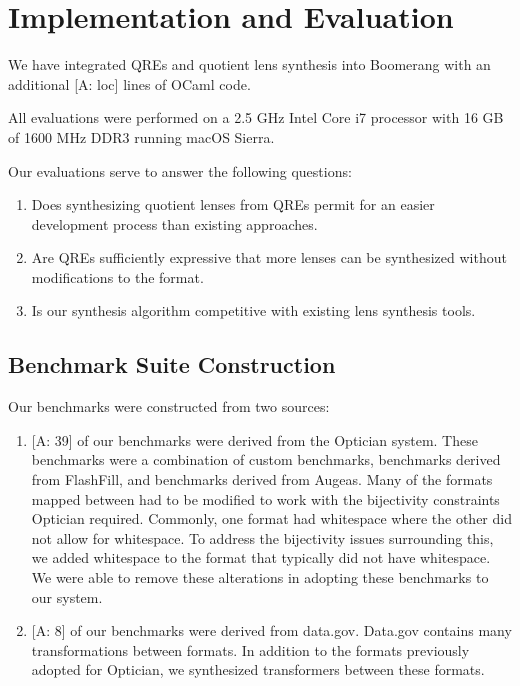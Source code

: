 \documentclass{svproc}
\newcommand{\FINISH}[3]{\ifdraft\textcolor{#1}{[#2: #3]}\fi}
\newcommand{\afm}[1]{\FINISH{dkgreen}{A}{#1}}
\begin{document}
\section{Implementation and Evaluation}
\label{impl}

We have integrated QREs and quotient lens synthesis into Boomerang with an
additional \afm{loc} lines of OCaml code. 

All evaluations were performed on a 2.5 GHz Intel Core i7 processor with 16 GB
of 1600 MHz DDR3 running macOS Sierra.

Our evaluations serve to answer the following questions:
\begin{enumerate}
\item Does synthesizing quotient lenses from QREs permit for an easier
  development process than existing approaches.

\item Are QREs sufficiently expressive that more lenses can be synthesized
  without modifications to the format. 

\item Is our synthesis algorithm competitive with existing lens synthesis
  tools.
\end{enumerate}

\subsection{Benchmark Suite Construction} 
Our benchmarks were constructed from two sources:
\begin{enumerate}
\item \afm{39} of our benchmarks were derived from the Optician system.  These
  benchmarks were a combination of custom benchmarks, benchmarks derived from
  FlashFill, and benchmarks derived from Augeas.  Many of the formats mapped
  between had to be modified to work with the bijectivity constraints
  Optician required.  Commonly, one format had whitespace where the other did
  not allow for whitespace.  To address the bijectivity issues surrounding this,
  we added whitespace to the format that typically did not have whitespace.  We
  were able to remove these alterations in adopting these benchmarks to our
  system.

\item \afm{8} of our benchmarks were derived from data.gov.  Data.gov contains
  many transformations between formats.  In addition to the formats previously
  adopted for Optician, we synthesized transformers between these formats.
\end{enumerate}
\end{document}
